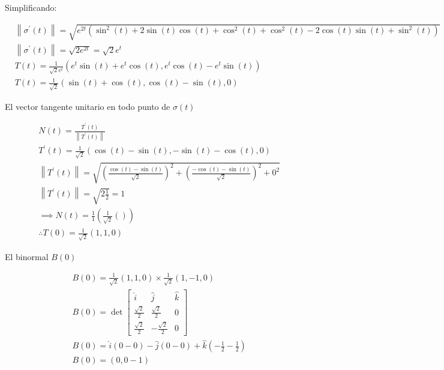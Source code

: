 Simplificando:

\begin{align*}
	 & \left\lVert \sigma^{\prime}(t)\right\rVert=\sqrt{e^{2t}\left(\sin^2{(t)}+2\sin{(t)}\cos{(t)}+\cos^2{(t)}+\cos^2{(t)}-2\cos{(t)}\sin{(t)}+\sin^2{(t)}\right)} \\
	 & \left\lVert \sigma^{\prime}(t)\right\rVert=\sqrt{2e^{2t}}=\sqrt{2}e^t                                                                                        \\
	 & T(t)=\frac{1}{\sqrt{2}e^t}\left(e^t\sin{(t)}+e^t\cos{(t)},e^t\cos{(t)}-e^t\sin{(t)}\right)                                                                   \\
	 & T(t)=\frac{1}{\sqrt{2}}\left(\sin{(t)}+\cos{(t)},\cos{(t)}-\sin{(t)},0\right)
\end{align*}

El vector tangente unitario en todo punto de $\sigma(t)$

\begin{align*}
	 & N(t)=\frac{T^{\prime}(t)}{\left\lVert T^{\prime}(t)\right\rVert }                                                                                         \\
	 & T^{\prime}(t)=\frac{1}{\sqrt{2}}\left(\cos{(t)}-\sin{(t)},-\sin{(t)}-\cos{(t)},0\right)                                                                   \\
	 & \left\lVert T^{\prime}(t)\right\rVert=\sqrt{\left(\frac{\cos{(t)}-\sin{(t)}}{\sqrt{2}}\right)^2+\left(\frac{-\cos{(t)}-\sin{(t)}}{\sqrt{2}}\right)^2+0^2} \\
	 & \left\lVert T^{\prime}(t)\right\rVert=\sqrt{2\frac{1}{2}}=1                                                                                               \\
	 & \implies N(t)=\frac{1}{1}\left(\frac{1}{\sqrt{2}}\left(\right)\right)                                                                                     \\
	 & \therefore T(0)=\frac{1}{\sqrt{2}}(1,1,0)
\end{align*}

El binormal $B(0)$

\begin{align*}
	 & B(0)=\frac{1}{\sqrt{2}}(1,1,0)\times\frac{1}{\sqrt{2}}(1,-1,0)                             \\
	 & B(0)=\det \begin{bmatrix}
		             \hat{i}            & \hat{j}             & \hat{k} \\
		             \frac{\sqrt{2}}{2} & \frac{\sqrt{2}}{2}  & 0       \\
		             \frac{\sqrt{2}}{2} & -\frac{\sqrt{2}}{2} & 0
	             \end{bmatrix} \\
	 & B(0)=\hat{i}\left(0-0\right)-\hat{j}(0-0)+\hat{k}\left(-\frac{1}{2}-\frac{1}{2}\right)     \\
	 & B(0)=(0,0-1)
\end{align*}

